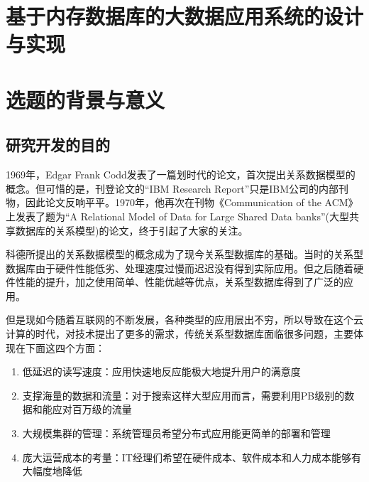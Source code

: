 \documentclass[proposal]{zjutreport}
\begin{document}



\frontmatter

\begingroup %
\let\clearpage\relax %

\titleformat{\chapter}[block]{\sihao\heiti\filcenter\bfseries}{\CJKnumber{\thechapter}}{1ex}{}{} %
\chapter*{基于内存数据库的大数据应用系统的设计与实现}
{} %

\mainmatter
\chapter{选题的背景与意义}
\section{研究开发的目的}
1969年，Edgar Frank Codd发表了一篇划时代的论文，首次提出关系数据模型的概念。但可惜的是，刊登论文的“IBM Research Report”只是IBM公司的内部刊物，因此论文反响平平。1970年，他再次在刊物《Communication of the ACM》上发表了题为“A Relational Model of Data for Large Shared Data banks”(大型共享数据库的关系模型)的论文，终于引起了大家的关注。

科德所提出的关系数据模型的概念成为了现今关系型数据库的基础。当时的关系型数据库由于硬件性能低劣、处理速度过慢而迟迟没有得到实际应用。但之后随着硬件性能的提升，加之使用简单、性能优越等优点，关系型数据库得到了广泛的应用。

但是现如今随着互联网的不断发展，各种类型的应用层出不穷，所以导致在这个云计算的时代，对技术提出了更多的需求，传统关系型数据库面临很多问题，主要体现在下面这四个方面：
\begin{enumerate}[label=（\arabic*）]
\item{低延迟的读写速度：应用快速地反应能极大地提升用户的满意度}
\item{支撑海量的数据和流量：对于搜索这样大型应用而言，需要利用PB级别的数据和能应对百万级的流量}
\item{大规模集群的管理：系统管理员希望分布式应用能更简单的部署和管理}
\item{庞大运营成本的考量：IT经理们希望在硬件成本、软件成本和人力成本能够有大幅度地降低}
\end{enumerate}
\end{document}
